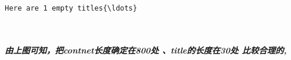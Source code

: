 \documentclass[11pt]{article}
\begin{document}
    \begin{Verbatim}[commandchars=\\\{\}]
Here are 1 empty titles{\ldots}
    \end{Verbatim}

    \begin{center}
    \end{center}
    { \hspace*{\fill} \\}
    
    \subparagraph{由上图可知，把contnet长度确定在800处 、title的长度在30处
比较合理的,}\label{ux7531ux4e0aux56feux53efux77e5ux628acontnetux957fux5ea6ux786eux5b9aux5728800ux5904-titleux7684ux957fux5ea6ux572830ux5904-ux6bd4ux8f83ux5408ux7406ux7684}
\end{document}
